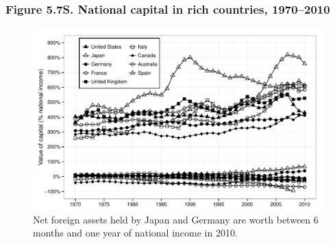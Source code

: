 \documentclass[t]{beamer}\usepackage[]{graphicx}\usepackage[]{color}
\newenvironment{knitrout}{}{} %
\begin{document}
\begin{frame}[label=Figure_5_7S]
\frametitle{Figure 5.7S. National capital in rich countries, 1970--2010}
\begin{figure}[t]
\begin{minipage}[b]{\textwidth}
\centering
\begin{knitrout}\footnotesize
{}\color{fgcolor}

{\centering \includegraphics[width=1\linewidth]{figures/bw/Figure_5_7S} 

}



\end{knitrout}
\caption{Net foreign assets held by Japan and Germany are worth between 6 months and one year of national income in 2010.}
\end{minipage}
\end{figure}
\end{frame}
\end{document}
